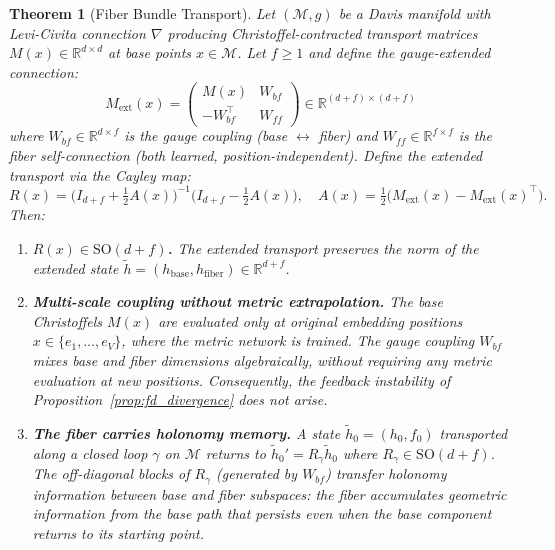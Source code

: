 \documentclass[11pt,letterpaper]{article}
\newtheorem{theorem}[conjecture]{Theorem}
\newcommand{\SO}{\mathrm{SO}}
\begin{document}
\begin{theorem}[Fiber Bundle Transport]\label{thm:fiber_transport}
Let $(\mathcal{M}, g)$ be a Davis manifold with Levi-Civita 
connection $\nabla$ producing Christoffel-contracted transport 
matrices $M(x) \in \mathbb{R}^{d \times d}$ at base points 
$x \in \mathcal{M}$. Let $f \geq 1$ and define the 
\emph{gauge-extended connection}:
\begin{equation}\label{eq:fiber_connection}
    M_{\mathrm{ext}}(x) = 
    \begin{pmatrix} M(x) & W_{bf} \\ 
    -W_{bf}^\top & W_{ff} \end{pmatrix}
    \in \mathbb{R}^{(d+f) \times (d+f)}
\end{equation}
where $W_{bf} \in \mathbb{R}^{d \times f}$ is the 
\emph{gauge coupling} (base $\leftrightarrow$ fiber) and 
$W_{ff} \in \mathbb{R}^{f \times f}$ is the \emph{fiber 
self-connection} (both learned, position-independent). Define the 
extended transport via the Cayley map:
\begin{equation}\label{eq:fiber_cayley}
    R(x) = \bigl(I_{d+f} + \tfrac{1}{2}A(x)\bigr)^{-1}
    \bigl(I_{d+f} - \tfrac{1}{2}A(x)\bigr), \quad
    A(x) = \tfrac{1}{2}\bigl(M_{\mathrm{ext}}(x) - 
    M_{\mathrm{ext}}(x)^\top\bigr).
\end{equation}
Then:
\begin{enumerate}
    \item \textbf{$R(x) \in \SO(d{+}f)$.} The extended transport 
    preserves the norm of the extended state 
    $\tilde{h} = (h_{\mathrm{base}}, h_{\mathrm{fiber}}) 
    \in \mathbb{R}^{d+f}$.
    
    \item \textbf{Multi-scale coupling without metric 
    extrapolation.} The base Christoffels $M(x)$ are evaluated 
    only at original embedding positions $x \in \{e_1, \ldots, 
    e_V\}$, where the metric network is trained. The gauge 
    coupling $W_{bf}$ mixes base and fiber dimensions 
    \emph{algebraically}, without requiring any metric evaluation 
    at new positions. Consequently, the feedback instability of 
    Proposition~\ref{prop:fd_divergence} does not arise.
    
    \item \textbf{The fiber carries holonomy memory.} A state 
    $\tilde{h}_0 = (h_0, f_0)$ transported along a closed loop 
    $\gamma$ on $\mathcal{M}$ returns to 
    $\tilde{h}_0' = R_\gamma \tilde{h}_0$ where 
    $R_\gamma \in \SO(d{+}f)$. The off-diagonal blocks of 
    $R_\gamma$ (generated by $W_{bf}$) transfer holonomy 
    information between base and fiber subspaces: the fiber 
    accumulates geometric information from the base path 
    that persists even when the base component returns to its 
    starting point.
    

\end{enumerate}
\end{theorem}
\end{document}
